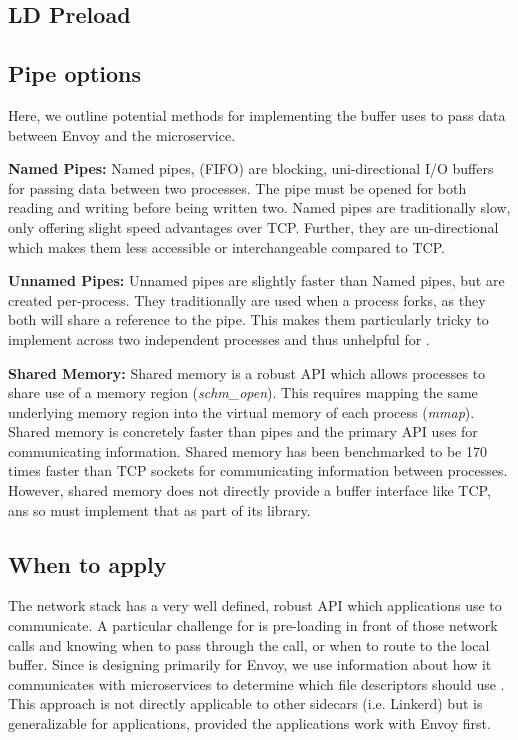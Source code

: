 \subsection{LD Preload}



\subsection{Pipe options}
Here, we outline potential methods for implementing the buffer \sysname uses to pass data between Envoy and the microservice.


\textbf{Named Pipes:}
Named pipes, (FIFO) are blocking, uni-directional I/O buffers for passing data between two processes.
The pipe must be opened for both reading and writing before being written two.
Named pipes are traditionally slow, only offering slight speed advantages over TCP.
Further, they are un-directional which makes them less accessible or interchangeable compared to TCP.

\textbf{Unnamed Pipes:}
Unnamed pipes are slightly faster than Named pipes, but are created per-process.
They traditionally are used when a process forks, as they both will share a reference to the pipe.
This makes them particularly tricky to implement across two independent processes and thus unhelpful for \sysname.

\textbf{Shared Memory:}
Shared memory is a robust API which allows processes to share use of a memory region (\textit{schm\_open}).
This requires mapping the same underlying memory region into the virtual memory of each process (\textit{mmap}).
Shared memory is concretely faster than pipes and the primary API \sysname uses for communicating information.
Shared memory has been benchmarked to be 170 times faster than TCP sockets for communicating information between processes.
However, shared memory does not directly provide a buffer interface like TCP, ans so \sysname must implement that as part of its library.


\subsection{When to apply \sysname}
The network stack has a very well defined, robust API which applications use to communicate.
A particular challenge for \sysname is pre-loading in front of those network calls and knowing when
to pass through the call, or when to route to the local buffer.
Since \sysname is designing primarily for Envoy, we use information about how it communicates with microservices to determine
which file descriptors should use \sysname.
This approach is not directly applicable to other sidecars (i.e. Linkerd) but is generalizable for applications, provided the applications work with Envoy first.


